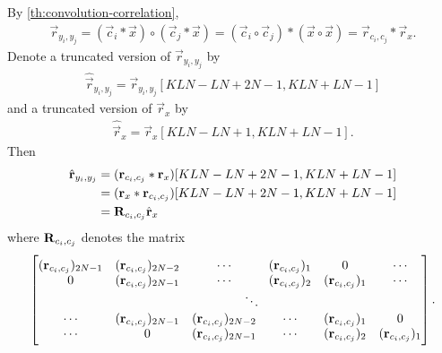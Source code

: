 \documentclass[a4paper, openany, oneside]{memoir}
\begin{document}
By \cref{th:convolution-correlation},
\begin{align*}
    \vec{r}_{y_i,y_j} =(\vec{c}_i \ast \vec{x}) \circ (\vec{c}_j \ast \vec{x}) = (\vec{c}_i \circ \vec{c}_j) \ast (\vec{x} \circ \vec{x}) = \vec{r}_{c_i,c_j} \ast \vec{r}_x.
\end{align*}
Denote a truncated version of $\vec{r}_{y_i,y_j}$ by
\begin{align*}
    \hat{\vec{r}}_{y_i,y_j} = \vec{r}_{y_i,y_j}[KLN-LN+2N-1,KLN+LN-1]
\end{align*}
and a truncated version of $\vec{r}_x$ by
\begin{align*}
    \hat{\vec{r}}_x = \vec{r}_x [KLN-LN+1,KLN+LN-1].
\end{align*}
Then
\begin{align*}
    \hat{\boldsymbol{\mathbf{r}}}_{y_i,y_j}
    &= (\boldsymbol{\mathbf{r}}_{c_i,c_j} \ast \boldsymbol{\mathbf{r}}_x)[KLN-LN+2N-1,KLN+LN-1]\\
    &= (\boldsymbol{\mathbf{r}}_x \ast \boldsymbol{\mathbf{r}}_{c_i,c_j})[KLN-LN+2N-1,KLN+LN-1] \\
    &= \boldsymbol{\mathbf{R}}_{c_i,c_j} \hat{\boldsymbol{\mathbf{r}}}_x
\end{align*}
where $\boldsymbol{\mathbf{R}}_{c_i,c_j}$ denotes the matrix
\begin{align*}
    \begin{bmatrix}
        (\vec{r}_{c_i,c_j})_{2N-1} & (\vec{r}_{c_i,c_j})_{2N-2} & \cdots &(\vec{r}_{c_i,c_j})_{1} & 0 & \cdots  \\
        0 & (\vec{r}_{c_i,c_j})_{2N-1} & \cdots & (\vec{r}_{c_i,c_j})_{2} & (\vec{r}_{c_i,c_j})_{1} & \cdots \\
        && \multicolumn{2}{c}{\ddots} \\
        \cdots & (\vec{r}_{c_i,c_j})_{2N-1} & (\vec{r}_{c_i,c_j})_{2N-2} & \cdots & (\vec{r}_{c_i,c_j})_{1} & 0 \\
        \cdots & 0 & (\vec{r}_{c_i,c_j})_{2N-1} & \cdots &(\vec{r}_{c_i,c_j})_{2} & (\vec{r}_{c_i,c_j})_{1} 
    \end{bmatrix}.
\end{align*}
\end{document}
